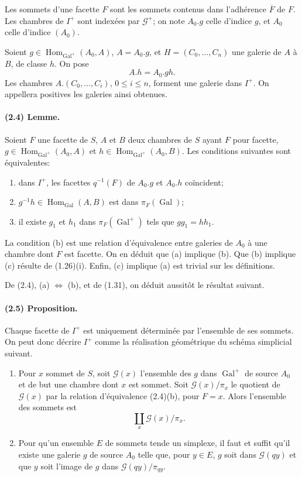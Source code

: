 \documentclass[10pt]{article}
\begin{document}
Les sommets d'une facette \(F\) sont les sommets contenus dans l'adhérence \(\overline F\) de \(F\). Les chambres de \(I^+\) sont indexées par \(\mathcal G^+\); on note \(A_0.g\) celle d'indice \(g\), et \(A_0\) celle d'indice \((A_0)\).

Soient \(g\in\operatorname{Hom}_{\operatorname{Gal}^+}(A_0,A)\), \(A=A_0.g\), et \(H=(C_0,\ldots,C_n)\) une galerie de \(A\) à \(B\), de classe \(h\). On pose
\[
A.h=A_0.gh.
\]
Les chambres \(A.(C_0,\ldots,C_i)\), \(0\le i\le n\), forment une galerie dans \(I^+\). On appellera positives les galeries ainsi obtenues.

\paragraph{(2.4) Lemme.} Soient \(F\) une facette de \(S\), \(A\) et \(B\) deux chambres de \(S\) ayant \(F\) pour facette, \(g\in\operatorname{Hom}_{\operatorname{Gal}^+}(A_0,A)\) et \(h\in\operatorname{Hom}_{\operatorname{Gal}^+}(A_0,B)\). Les conditions suivantes sont équivalentes:
\begin{enumerate}[label=(\alph*)]
\item dans \(I^+\), les facettes \(q^{-1}(F)\) de \(A_0.g\) et \(A_0.h\) coïncident;
\item \(g^{-1}h\in\operatorname{Hom}_{\operatorname{Gal}}(A,B)\) est dans \(\pi_F(\operatorname{Gal})\);
\item il existe \(g_1\) et \(h_1\) dans \(\pi_F(\operatorname{Gal}^+)\) tels que \(gg_1=hh_1\).
\end{enumerate}
La condition (b) est une relation d'équivalence entre galeries de \(A_0\) à une chambre dont \(F\) est facette. On en déduit que (a) implique (b). Que (b) implique (c) résulte de (1.26)(i). Enfin, (c) implique (a) est trivial sur les définitions.

De (2.4), (a) \(\Leftrightarrow\) (b), et de (1.31), on déduit aussitôt le résultat suivant.

\paragraph{(2.5) Proposition.} Chaque facette de \(I^+\) est uniquement déterminée par l'ensemble de ses sommets. On peut donc décrire \(I^+\) comme la réalisation géométrique du schéma simplicial suivant.
\begin{enumerate}[label=\alph*)]
\item Pour \(x\) sommet de \(S\), soit \(\mathcal G(x)\) l'ensemble des \(g\) dans \(\operatorname{Gal}^+\) de source \(A_0\) et de but une chambre dont \(x\) est sommet. Soit \(\mathcal G(x)/\pi_x\) le quotient de \(\mathcal G(x)\) par la relation d'équivalence (2.4)(b), pour \(F=x\). Alors l'ensemble des sommets est
\[
\coprod_x \mathcal G(x)/\pi_x.
\]
\item Pour qu'un ensemble \(E\) de sommets tende un simplexe, il faut et suffit qu'il existe une galerie \(g\) de source \(A_0\) telle que, pour \(y\in E\), \(g\) soit dans \(\mathcal G(qy)\) et que \(y\) soit l'image de \(g\) dans \(\mathcal G(qy)/\pi_{qy}\).
\end{enumerate}
\end{document}
